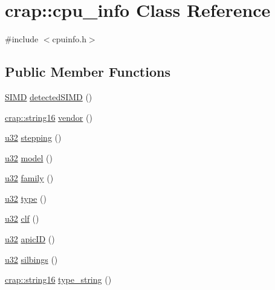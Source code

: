 \hypertarget{classcrap_1_1cpu__info}{\section{crap\-:\-:cpu\-\_\-info Class Reference}
\label{classcrap_1_1cpu__info}
}


{\ttfamily \#include $<$cpuinfo.\-h$>$}

\subsection*{Public Member Functions}
\begin{DoxyCompactItemize}
\item 
\hyperlink{namespacecrap_a716cc09ff97cb823b682ae0cc3241f1c}{S\-I\-M\-D} \hyperlink{classcrap_1_1cpu__info_abb2eec727fb2f59174881e22670b6c62}{detected\-S\-I\-M\-D} ()
\item 
\hyperlink{namespacecrap_a8dc1eae8e96102b47b5713e982ddc7b6}{crap\-::string16} \hyperlink{classcrap_1_1cpu__info_ac78056106f44619f82da854f53858d47}{vendor} ()
\item 
\hyperlink{types_8h_afaa62991928fb9fb18ff0db62a040aba}{u32} \hyperlink{classcrap_1_1cpu__info_aad6f93fd91c7645a21bf867a944ee812}{stepping} ()
\item 
\hyperlink{types_8h_afaa62991928fb9fb18ff0db62a040aba}{u32} \hyperlink{classcrap_1_1cpu__info_ac90fecd39bc1c042e88c01669ed894ec}{model} ()
\item 
\hyperlink{types_8h_afaa62991928fb9fb18ff0db62a040aba}{u32} \hyperlink{classcrap_1_1cpu__info_a7380f1643b3daaf5fdd523bf810d5421}{family} ()
\item 
\hyperlink{types_8h_afaa62991928fb9fb18ff0db62a040aba}{u32} \hyperlink{classcrap_1_1cpu__info_a39db3c2ac9098a76254391e6d122f76e}{type} ()
\item 
\hyperlink{types_8h_afaa62991928fb9fb18ff0db62a040aba}{u32} \hyperlink{classcrap_1_1cpu__info_aaf19e8cdb5568f5d8688eb055128a1de}{clf} ()
\item 
\hyperlink{types_8h_afaa62991928fb9fb18ff0db62a040aba}{u32} \hyperlink{classcrap_1_1cpu__info_a6007effe216db00bb6960f69e8ba7890}{apic\-I\-D} ()
\item 
\hyperlink{types_8h_afaa62991928fb9fb18ff0db62a040aba}{u32} \hyperlink{classcrap_1_1cpu__info_a81a6e5c7d00f8843b64e3da177f339c4}{silbings} ()
\item 
\hyperlink{namespacecrap_a8dc1eae8e96102b47b5713e982ddc7b6}{crap\-::string16} \hyperlink{classcrap_1_1cpu__info_a22f33d4eb96cbdb536efeb2a5ba966d0}{type\-\_\-string} ()

\end{DoxyCompactItemize}
